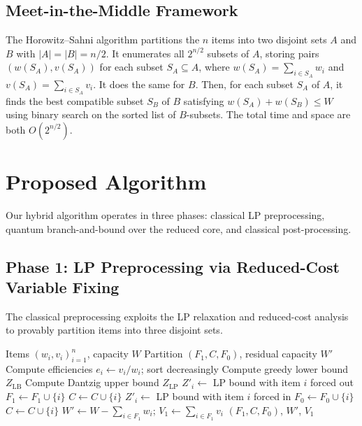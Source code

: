 \documentclass[conference]{IEEEtran}
\begin{document}
\subsection{Meet-in-the-Middle Framework}

The Horowitz--Sahni algorithm \cite{ref2} partitions the $n$ items into two disjoint sets $A$ and $B$ with $|A| = |B| = n/2$. It enumerates all $2^{n/2}$ subsets of $A$, storing pairs $(w(S_A), v(S_A))$ for each subset $S_A \subseteq A$, where $w(S_A) = \sum_{i \in S_A} w_i$ and $v(S_A) = \sum_{i \in S_A} v_i$. It does the same for $B$. Then, for each subset $S_A$ of $A$, it finds the best compatible subset $S_B$ of $B$ satisfying $w(S_A) + w(S_B) \leq W$ using binary search on the sorted list of $B$-subsets. The total time and space are both $O(2^{n/2})$.

\section{Proposed Algorithm}

Our hybrid algorithm operates in three phases: classical LP preprocessing, quantum branch-and-bound over the reduced core, and classical post-processing.

\subsection{Phase 1: LP Preprocessing via Reduced-Cost Variable Fixing}

The classical preprocessing exploits the LP relaxation and reduced-cost analysis to provably partition items into three disjoint sets.

\begin{algorithm}[h]
\caption{Reduced-Cost Variable Fixing}
\label{alg:filter}
\begin{algorithmic}[1]
\REQUIRE Items $(w_i, v_i)_{i=1}^n$, capacity $W$
\ENSURE Partition $(F_1, C, F_0)$, residual capacity $W'$
\STATE Compute efficiencies $e_i \leftarrow v_i / w_i$; sort decreasingly
\STATE Compute greedy lower bound $Z_{\text{LB}}$
\STATE Compute Dantzig upper bound $Z_{\text{LP}}$
        \STATE $Z'_i \leftarrow$ LP bound with item $i$ forced out
            \STATE $F_1 \leftarrow F_1 \cup \{i\}$ 
        \ELSE
            \STATE $C \leftarrow C \cup \{i\}$
        \ENDIF
    \ELSE
        \STATE $Z'_i \leftarrow$ LP bound with item $i$ forced in
            \STATE $F_0 \leftarrow F_0 \cup \{i\}$ 
        \ELSE
            \STATE $C \leftarrow C \cup \{i\}$
        \ENDIF
    \ENDIF
\ENDFOR
\STATE $W' \leftarrow W - \sum_{i \in F_1} w_i$; $V_1 \leftarrow \sum_{i \in F_1} v_i$
\RETURN $(F_1, C, F_0)$, $W'$, $V_1$
\end{algorithmic}
\end{algorithm}
\end{document}
